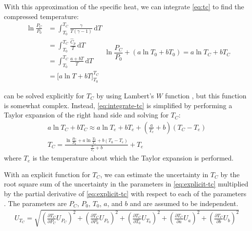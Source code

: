\documentclass[../main.tex]{subfiles}
\begin{document}
With this approximation of the specific heat, we can integrate \cref{eq:tc}
to find the compressed temperature:
%
\begin{subequations}
\begin{align}
\ln{\frac{P_C}{P_0}}
&= \int_{T_0}^{T_{C}} \! \frac{\gamma}{T\left(\gamma-1\right)} \, \mathrm{d} T \\
&= \int_{T_0}^{T_{C}} \! \frac{\hat{C}_p}{T} \, \mathrm{d} T \\
&= \int_{T_0}^{T_{C}} \! \frac{a + b T}{T} \, \mathrm{d} T\\
&= \Big[a \ln{T} + b T \Big]_{T_0}^{T_C}
\end{align}
\begin{equation}
\ln{\frac{P_C}{P_0}} + \left(a \ln{T_0} + b T_0\right) = a \ln{T_C} + b T_C \label{eq:integrate-tc}
\end{equation}
\end{subequations}

 can be solved explicitly for $T_C$ by using
Lambert's $W$ function \cite{Corless1996}, but this function is somewhat
complex. Instead, \cref{eq:integrate-tc} is simplified by performing a
Taylor expansion of the right hand side and solving for $T_C$:
%
\begin{gather}
a \ln{T_C} + b T_C \approx a \ln{T_e} + bT_e + \left(\frac{a}{T_e} + b\right)\left(T_C - T_e\right) \\
T_C = \frac{\ln{\frac{P_C}{P_0}} + a \ln{\frac{T_0}{T_e}} + b\left(T_0 - T_e\right)}{\frac{a}{T_e}+b} + T_e \label{eq:explicit-tc}
\end{gather}
%
where $T_e$ is the temperature about which the Taylor expansion is performed.

With an explicit function for $T_C$, we can estimate the uncertainty in
$T_C$ by the root square sum of the uncertainty in the parameters in
\cref{eq:explicit-tc} multiplied by the partial derivative of
\cref{eq:explicit-tc} with respect to each of the parameters
\cite{Taylor1982}. The parameters are $P_C$, $P_0$, $T_0$, $a$, and $b$
and are assumed to be independent.
%
\begin{align}
\label{eq:tc-unc}
U_{T_C} = \sqrt{\left(\frac{\partial T_C}{\partial P_C} U_{P_C}\right)^2 + \left(\frac{\partial T_C}{\partial P_0} U_{P_0}\right)^2 +
                \left(\frac{\partial T_C}{\partial T_0} U_{T_0}\right)^2 + \left(\frac{\partial T_C}{\partial a} U_{a}\right)^2 +
                \left(\frac{\partial T_C}{\partial b} U_{b}\right)^2}
\end{align}
\end{document}
